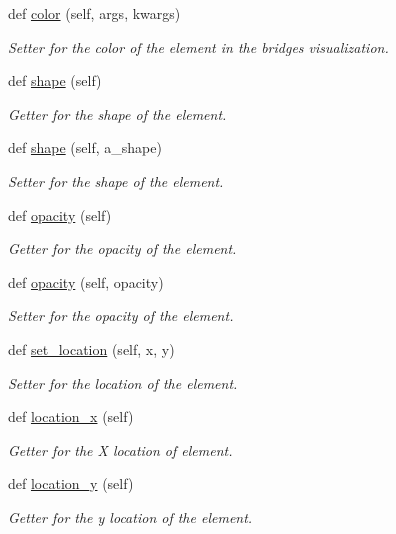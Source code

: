 \begin{DoxyCompactItemize}
def \hyperlink{classbridges_1_1element__visualizer_1_1_element_visualizer_a8579ca1bda361a0ba44efda8683480bd}{color} (self, args, kwargs)
\begin{DoxyCompactList}\small\item\em Setter for the color of the element in the bridges visualization. \end{DoxyCompactList}\item 
def \hyperlink{classbridges_1_1element__visualizer_1_1_element_visualizer_a79ee08777449e532ff2131785647b515}{shape} (self)
\begin{DoxyCompactList}\small\item\em Getter for the shape of the element. \end{DoxyCompactList}\item 
def \hyperlink{classbridges_1_1element__visualizer_1_1_element_visualizer_af4bd377b8fb9a35c10740de7ea8c5eee}{shape} (self, a\+\_\+shape)
\begin{DoxyCompactList}\small\item\em Setter for the shape of the element. \end{DoxyCompactList}\item 
def \hyperlink{classbridges_1_1element__visualizer_1_1_element_visualizer_a64288f56aa9cb5f3ccf703d696df1c04}{opacity} (self)
\begin{DoxyCompactList}\small\item\em Getter for the opacity of the element. \end{DoxyCompactList}\item 
def \hyperlink{classbridges_1_1element__visualizer_1_1_element_visualizer_ab282e5e9b704c8ccf923cc117b541b3a}{opacity} (self, opacity)
\begin{DoxyCompactList}\small\item\em Setter for the opacity of the element. \end{DoxyCompactList}\item 
def \hyperlink{classbridges_1_1element__visualizer_1_1_element_visualizer_a7aef4402f2de7e88a3260bbec3a708a7}{set\+\_\+location} (self, x, y)
\begin{DoxyCompactList}\small\item\em Setter for the location of the element. \end{DoxyCompactList}\item 
def \hyperlink{classbridges_1_1element__visualizer_1_1_element_visualizer_a10fc24a04e43afcb393f3444bd93f5d9}{location\+\_\+x} (self)
\begin{DoxyCompactList}\small\item\em Getter for the X location of element. \end{DoxyCompactList}\item 
def \hyperlink{classbridges_1_1element__visualizer_1_1_element_visualizer_a687747f04ae17dea9d15706602688a32}{location\+\_\+y} (self)
\begin{DoxyCompactList}\small\item\em Getter for the y location of the element. \end{DoxyCompactList}\end{DoxyCompactItemize}
